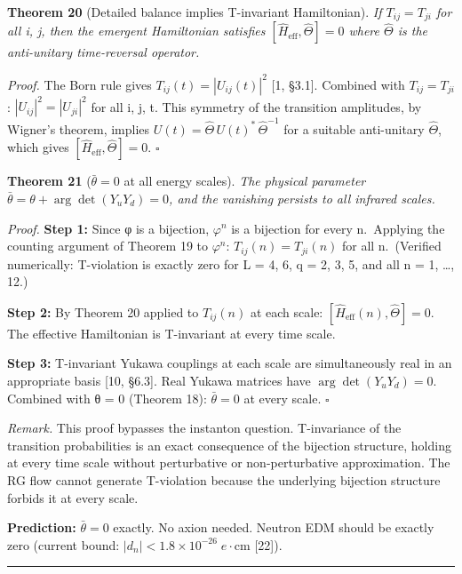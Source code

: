 \documentclass[
  11pt,
]{article}
\begin{document}
\textbf{Theorem 20} (Detailed balance implies T-invariant Hamiltonian).
\emph{If \(T_{ij} = T_{ji}\) for all i, j, then the emergent Hamiltonian
satisfies \([\hat{H}_{\text{eff}}, \hat{\Theta}] = 0\) where
\(\hat{\Theta}\) is the anti-unitary time-reversal operator.}

\emph{Proof.} The Born rule gives \(T_{ij}(t) = |U_{ij}(t)|^2\) {[}1,
§3.1{]}. Combined with \(T_{ij} = T_{ji}\): \(|U_{ij}|^2 = |U_{ji}|^2\)
for all i, j, t. This symmetry of the transition amplitudes, by Wigner's
theorem, implies \(U(t) = \hat{\Theta}\,U(t)^*\,\hat{\Theta}^{-1}\) for
a suitable anti-unitary \(\hat{\Theta}\), which gives
\([\hat{H}_{\text{eff}}, \hat{\Theta}] = 0\). \(\square\)

\textbf{Theorem 21} (\(\bar{\theta} = 0\) at all energy scales).
\emph{The physical parameter
\(\bar{\theta} = \theta + \arg\det(Y_u Y_d) = 0\), and the vanishing
persists to all infrared scales.}

\emph{Proof.} \textbf{Step 1:} Since φ is a bijection, \(\varphi^n\) is
a bijection for every n.~Applying the counting argument of Theorem 19 to
\(\varphi^n\): \(T_{ij}(n) = T_{ji}(n)\) for all n.~(Verified
numerically: T-violation is exactly zero for L = 4, 6, q = 2, 3, 5, and
all n = 1, \ldots, 12.)

\textbf{Step 2:} By Theorem 20 applied to \(T_{ij}(n)\) at each scale:
\([\hat{H}_{\mathrm{eff}}(n), \hat{\Theta}] = 0\). The effective
Hamiltonian is T-invariant at every time scale.

\textbf{Step 3:} T-invariant Yukawa couplings at each scale are
simultaneously real in an appropriate basis {[}10, §6.3{]}. Real Yukawa
matrices have \(\arg\det(Y_u Y_d) = 0\). Combined with θ = 0 (Theorem
18): \(\bar{\theta} = 0\) at every scale. \(\square\)

\emph{Remark.} This proof bypasses the instanton question. T-invariance
of the transition probabilities is an exact consequence of the bijection
structure, holding at every time scale without perturbative or
non-perturbative approximation. The RG flow cannot generate T-violation
because the underlying bijection structure forbids it at every scale.

\textbf{Prediction:} \(\bar{\theta} = 0\) exactly. No axion needed.
Neutron EDM should be exactly zero (current bound:
\(|d_n| < 1.8 \times 10^{-26}\;e\cdot\text{cm}\) {[}22{]}).

\begin{center}\rule{0.5\linewidth}{0.5pt}\end{center}
\end{document}
